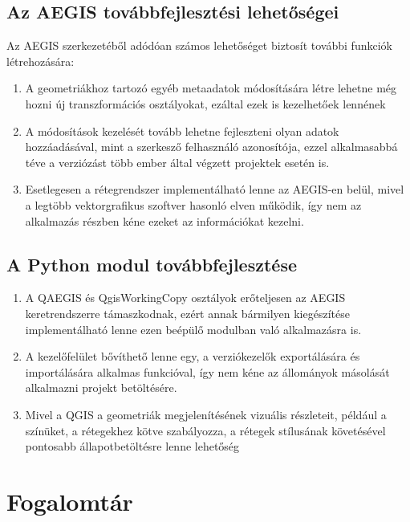 \subsection{Az AEGIS továbbfejlesztési lehetőségei}
Az AEGIS szerkezetéből adódóan számos lehetőséget biztosít további funkciók létrehozására:
\begin{enumerate}
	\item A geometriákhoz tartozó egyéb metaadatok módosítására létre lehetne még hozni új transzformációs osztályokat, ezáltal ezek is kezelhetőek lennének
	\item A módosítások kezelését tovább lehetne fejleszteni olyan adatok hozzáadásával, mint a szerkesző felhasználó azonosítója, ezzel alkalmasabbá téve a verziózást több ember által végzett projektek esetén is.
	\item Esetlegesen a rétegrendszer implementálható lenne az AEGIS-en belül, mivel a legtöbb vektorgrafikus szoftver hasonló elven működik, így nem az alkalmazás részben kéne ezeket az információkat kezelni.
\end{enumerate}
\subsection{A Python modul továbbfejlesztése}
\begin{enumerate}
	\item A QAEGIS és QgisWorkingCopy osztályok erőteljesen az AEGIS keretrendszerre támaszkodnak, ezért annak bármilyen kiegészítése implementálható lenne ezen beépülő modulban való alkalmazásra is.
	\item A kezelőfelület bővíthető lenne egy, a verziókezelők exportálására és importálására alkalmas funkcióval, így nem kéne az állományok másolását alkalmazni projekt betöltésére.
	\item Mivel a QGIS a geometriák megjelenítésének vizuális részleteit, például a színüket, a rétegekhez kötve szabályozza, a rétegek stílusának követésével pontosabb állapotbetöltésre lenne lehetőség
\end{enumerate}

\section{Fogalomtár}
\label{sec:definitions}

